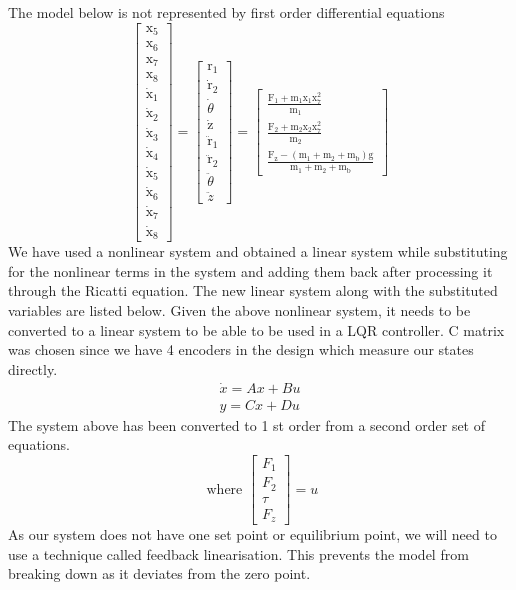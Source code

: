 \documentclass{UoNMCHA}
\numberwithin{equation}{section}
\begin{document}
	The model below is not represented by first order differential equations
	$$
	\left[\begin{array}{c}
	\mathrm{x}_{5} \\
	\mathrm{x}_{6} \\
	\mathrm{x}_{7} \\
	\mathrm{x}_{8} \\
	\dot{\mathrm{x}}_{1} \\
	\dot{\mathrm{x}}_{2} \\
	\dot{\mathrm{x}}_{3} \\
	\dot{\mathrm{x}}_{4} \\
	\dot{\mathrm{x}}_{5} \\
	\dot{\mathrm{x}}_{6} \\
	\dot{\mathrm{x}}_{7} \\
	\dot{\mathrm{x}}_{8}
	\end{array}\right]=\left[\begin{array}{c}
	{\mathrm{r}}_{1} \\
	\dot{\mathrm{r}}_{2} \\
	\dot{\theta} \\
	\dot{\mathrm{z}} \\
	\ddot{\mathrm{r}}_{1} \\
	\ddot{\mathrm{r}}_{2} \\
	\ddot{\theta} \\
	\ddot{z}
	\end{array}\right]=\left[\begin{array}{c}
	\frac{\mathrm{F}_{1}+\mathrm{m}_{1} \mathrm{x}_{1} \mathrm{x}_{7}^{2}}{\mathrm{~m}_{1}} \\
	\frac{\mathrm{F}_{2}+\mathrm{m}_{2} \mathrm{x}_{2} \mathrm{x}_{7}^{2}}{\mathrm{~m}_{2}} \\
	\frac{\mathrm{F}_{\mathrm{z}}-\left(\mathrm{m}_{1}+\mathrm{m}_{2}+\mathrm{m}_{\mathrm{b}}\right) \mathrm{g}}{\mathrm{m}_{1}+\mathrm{m}_{2}+\mathrm{m}_{\mathrm{b}}}
	\end{array}\right]
	$$
	We have used a nonlinear system and obtained a linear system while substituting for the nonlinear terms
	in the system and adding them back after processing it through the Ricatti equation. The new linear
	system along with the substituted variables are listed below. Given the above nonlinear system, it needs
	to be converted to a linear system to be able to be used in a LQR controller. C matrix was chosen since
	we have 4 encoders in the design which measure our states directly.
	$$
	\begin{array}{l}
	\dot{x}=A x+B u \\
	y=C x+D u
	\end{array}
	$$
	The system above has been converted to 1 st order from a second order set of equations.
	$$
	\text { where }\left[\begin{array}{c}
	F_{1} \\
	F_{2} \\
	\tau \\
	F_{z}
	\end{array}\right]=u
	$$
	As our system does not have one set point or equilibrium point, we will need to use a technique called
	feedback linearisation. This prevents the model from breaking down as it deviates from the zero point.
	
\end{document}
